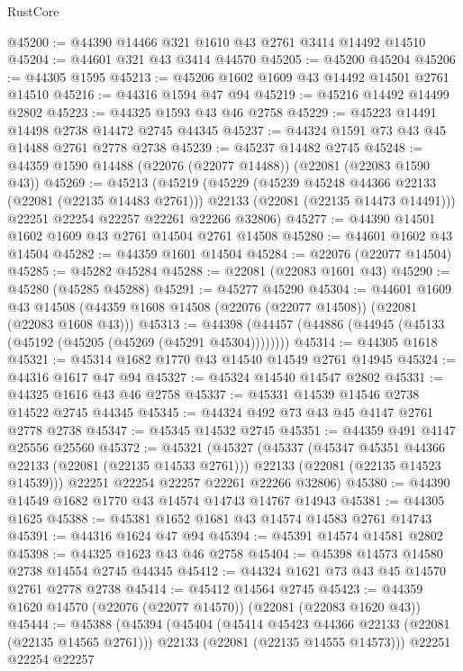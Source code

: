 \begin{lexlean}{RustCore}
\begin{coremodule}
@45200 := @44390 @14466 @321 @1610 @43 @2761 @3414 @14492 @14510
@45204 := @44601 @321 @43 @3414 @44570
@45205 := @45200 @45204
@45206 := @44305 @1595
@45213 := @45206 @1602 @1609 @43 @14492 @14501 @2761 @14510
@45216 := @44316 @1594 @47 @94
@45219 := @45216 @14492 @14499 @2802
@45223 := @44325 @1593 @43 @46 @2758
@45229 := @45223 @14491 @14498 @2738 @14472 @2745 @44345
@45237 := @44324 @1591 @73 @43 @45 @14488 @2761 @2778 @2738
@45239 := @45237 @14482 @2745
@45248 := @44359 @1590 @14488 (@22076 (@22077 @14488)) (@22081 (@22083 @1590 @43))
@45269 := @45213
    (@45219
      (@45229
        (@45239 @45248 @44366 @22133 (@22081 (@22135 @14483 @2761)))
        @22133
        (@22081 (@22135 @14473 @14491)))
      @22251
      @22254
      @22257
      @22261
      @22266
      @32806)
@45277 := @44390 @14501 @1602 @1609 @43 @2761 @14504 @2761 @14508
@45280 := @44601 @1602 @43 @14504
@45282 := @44359 @1601 @14504
@45284 := @22076 (@22077 @14504)
@45285 := @45282 @45284
@45288 := @22081 (@22083 @1601 @43)
@45290 := @45280 (@45285 @45288)
@45291 := @45277 @45290
@45304 := @44601
    @1609
    @43
    @14508
    (@44359 @1608 @14508 (@22076 (@22077 @14508)) (@22081 (@22083 @1608 @43)))
@45313 := @44398 (@44457 (@44886 (@44945 (@45133 (@45192 (@45205 (@45269 (@45291 @45304))))))))
@45314 := @44305 @1618
@45321 := @45314 @1682 @1770 @43 @14540 @14549 @2761 @14945
@45324 := @44316 @1617 @47 @94
@45327 := @45324 @14540 @14547 @2802
@45331 := @44325 @1616 @43 @46 @2758
@45337 := @45331 @14539 @14546 @2738 @14522 @2745 @44345
@45345 := @44324 @492 @73 @43 @45 @4147 @2761 @2778 @2738
@45347 := @45345 @14532 @2745
@45351 := @44359 @491 @4147 @25556 @25560
@45372 := @45321
    (@45327
      (@45337
        (@45347 @45351 @44366 @22133 (@22081 (@22135 @14533 @2761)))
        @22133
        (@22081 (@22135 @14523 @14539)))
      @22251
      @22254
      @22257
      @22261
      @22266
      @32806)
@45380 := @44390 @14549 @1682 @1770 @43 @14574 @14743 @14767 @14943
@45381 := @44305 @1625
@45388 := @45381 @1652 @1681 @43 @14574 @14583 @2761 @14743
@45391 := @44316 @1624 @47 @94
@45394 := @45391 @14574 @14581 @2802
@45398 := @44325 @1623 @43 @46 @2758
@45404 := @45398 @14573 @14580 @2738 @14554 @2745 @44345
@45412 := @44324 @1621 @73 @43 @45 @14570 @2761 @2778 @2738
@45414 := @45412 @14564 @2745
@45423 := @44359 @1620 @14570 (@22076 (@22077 @14570)) (@22081 (@22083 @1620 @43))
@45444 := @45388
    (@45394
      (@45404
        (@45414 @45423 @44366 @22133 (@22081 (@22135 @14565 @2761)))
        @22133
        (@22081 (@22135 @14555 @14573)))
      @22251
      @22254
      @22257

\end{coremodule}
\end{lexlean}
